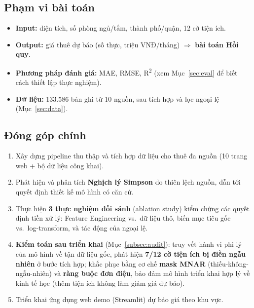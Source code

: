 \subsection{Phạm vi bài toán}

\begin{itemize}[leftmargin=*, itemsep=3pt]
  \item \textbf{Input:} diện tích, số phòng ngủ/tắm, thành phố/quận, 12 cờ tiện ích.
  \item \textbf{Output:} giá thuê dự báo (số thực, triệu VNĐ/tháng)
        $\Rightarrow$ \textbf{bài toán Hồi quy}.
  \item \textbf{Phương pháp đánh giá:} MAE, RMSE, R\textsuperscript{2}
        (xem Mục~\ref{sec:eval} để biết cách thiết lập thực nghiệm).
  \item \textbf{Dữ liệu:} 133.586 bản ghi từ 10 nguồn, sau tích hợp và lọc ngoại lệ
        (Mục~\ref{sec:data}).
\end{itemize}

\subsection{Đóng góp chính}

\begin{enumerate}[leftmargin=*, itemsep=3pt]
  \item Xây dựng pipeline thu thập và tích hợp dữ liệu cho thuê đa nguồn
        (10 trang web + bộ dữ liệu công khai).
  \item Phát hiện và phân tích \textbf{Nghịch lý Simpson} do thiên lệch nguồn,
        dẫn tới quyết định thiết kế mô hình có căn cứ.
  \item Thực hiện \textbf{3 thực nghiệm đối sánh} (ablation study) kiểm chứng
        các quyết định tiền xử lý: Feature Engineering vs.\ dữ liệu thô,
        biến mục tiêu gốc vs.\ log-transform, và tác động của ngoại lệ.
  \item \textbf{Kiểm toán sau triển khai} (Mục~\ref{subsec:audit}): truy vết hành vi
        phi lý của mô hình về tận dữ liệu gốc, phát hiện \textbf{7/12 cờ tiện ích bị điền
        ngẫu nhiên} ở bước tích hợp; khắc phục bằng cơ chế \textbf{mask MNAR}
        (thiếu-không-ngẫu-nhiên) và \textbf{ràng buộc đơn điệu}, bảo đảm mô hình
        triển khai hợp lý về kinh tế học (thêm tiện ích không làm giảm giá dự báo).
  \item Triển khai ứng dụng web demo (Streamlit) dự báo giá theo khu vực.
\end{enumerate}
